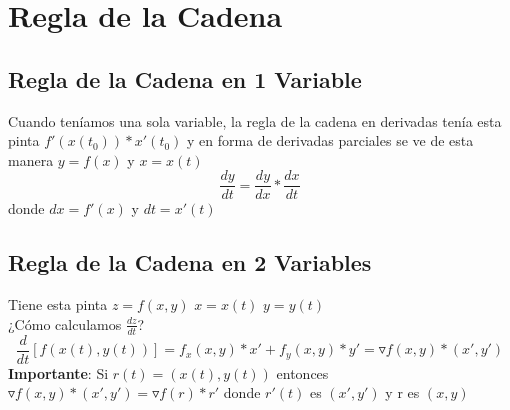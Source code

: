 \documentclass[10pt,a4paper]{article}
\begin{document}
\section*{Regla de la Cadena}
\subsection*{Regla de la Cadena en 1 Variable}
Cuando teníamos una sola variable, la regla de la cadena en derivadas tenía esta pinta $f'(x(t_{0})) * x'(t_{0})$ y en forma de derivadas parciales se ve de esta manera $y=f(x)$ y $x=x(t)$ 
\[\frac{dy}{dt} = \frac{dy}{dx} * \frac{dx}{dt} \]
donde $dx = f'(x)$ y $dt = x'(t)$ 
\subsection*{Regla de la Cadena en 2 Variables}
Tiene esta pinta $z = f(x,y)$ $x=x(t)$ $y=y(t)$ \\
¿Cómo calculamos $\frac{dz}{dt}$?
\[\frac{d}{dt}[f(x(t), y(t))] = f_{x}(x, y) * x' + f_{y}(x,y) * y' = \triangledown f(x,y) * (x', y')\]
\textbf{Importante}: Si $r(t) = (x(t), y(t))$ entonces $\triangledown f(x,y) * (x', y') = \triangledown f (r) * r'$ donde $r'(t)$ es $(x', y')$ y r es $(x,y)$
\end{document}
